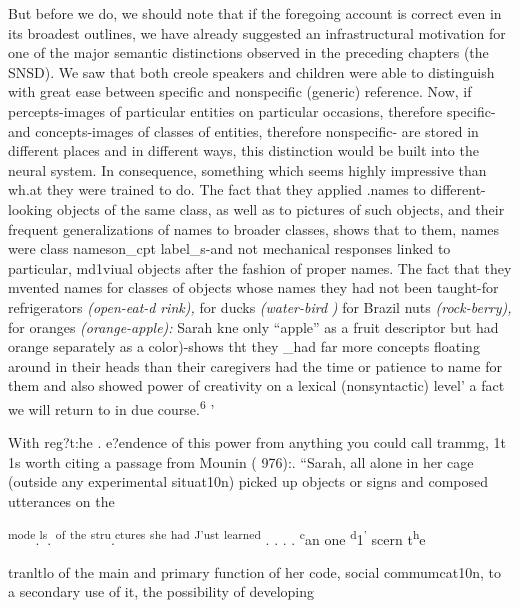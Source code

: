 But before we do, we should note that if the foregoing account
is correct even in its broadest outlines, we have already suggested an infrastructural motivation for one of the major semantic distinctions observed in the preceding chapters (the SNSD). We saw that both creole speakers and children were able to distinguish with great ease between specific and nonspecific (generic) reference. Now, if percepts-images of particular entities on particular occasions, therefore specific-and concepts-images of classes of entities, therefore nonspecific- are stored in different places and in different ways, this distinction would be built into the neural system. In consequence, something which seems highly
impressive than wh.at they were trained to do. The fact that they applied .names to different-looking objects of the same class, as well as to pictures of such objects, and their frequent generalizations of names to broader classes, shows that to them, names were class names\-on\_cpt label\_s-and not mechanical responses linked to particular, md1viual objects after the fashion of proper names. The fact that they mvented names for classes of objects whose names they had not been taught-for refrigerators \textit{(open-eat-d} \textit{rink),} for ducks \textit{(water-bird} \textit{)} for Brazil nuts \textit{(roc}\textit{k}\textit{{}-berr}\textit{y}\textit{), }for oranges \textit{(orange-apple):} Sarah kne only ``apple'' as a fruit descriptor but had orange separately as a co\-lor)-shows tht they \_had far more concepts floating around in their heads than their caregivers had the time or patience to name for them and also showed power of creativity on a lexical (nonsyntactic) level' a fact we will return to in due course.\textsuperscript{6 }'

With reg?t:he . e?endence of this power from anything you could call trammg, 1t 1s worth citing a passage from Mounin ( 976):. ``Sarah, all alone in her cage (outside any experimental situa\-t10n) picked up objects or signs and composed utterances on the

\textsuperscript{mod}\textsuperscript{e}.\textsuperscript{l}\textsuperscript{s}. \textsuperscript{of} \textsuperscript{the} \textsuperscript{str}\textsuperscript{u}.\textsuperscript{ctures} \textsuperscript{she} \textsuperscript{had} \textsuperscript{J}\textsuperscript{'ust} \textsuperscript{learned} . . . . \textsuperscript{c}an one \textsuperscript{d}1\textsuperscript{'} scern t\textsuperscript{h}e

tranltlo of the main and primary function of her code, social com\-mumcat10n, to a secondary use of it, the possibility of developing

